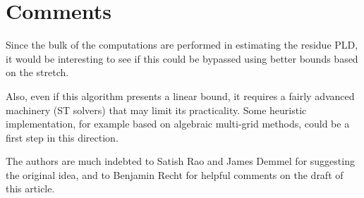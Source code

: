 
\section*{Comments}

Since the bulk of the computations are performed in estimating the
residue PLD, it would be interesting to see if this could be bypassed
using better bounds based on the stretch.

Also, even if this algorithm presents a linear bound, it requires
a fairly advanced machinery (ST solvers) that may limit its practicality.
Some heuristic implementation, for example based on algebraic multi-grid
methods, could be a first step in this direction.

The authors are much indebted to Satish Rao and James Demmel for suggesting
the original idea, and to Benjamin Recht for helpful comments on the
draft of this article. 
